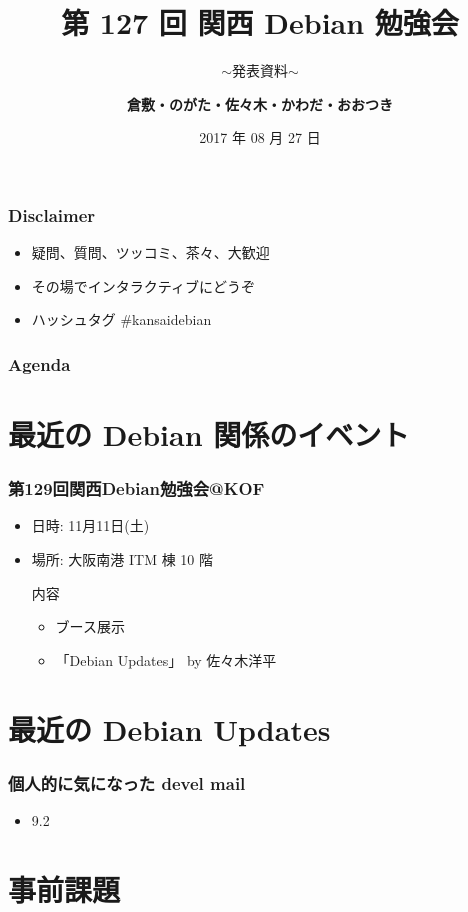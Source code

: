 \documentclass[cjk,dvipdfmx,12pt,compress,%
hyperref={bookmarks=true,bookmarksnumbered=true,bookmarksopen=false,%
colorlinks=false,%
pdftitle={第 120 回 関西 Debian 勉強会},%
pdfauthor={倉敷・のがた・佐々木・かわだ・おおつき},%
pdfsubject={資料},%
}]{beamer}
\title{第 127 回 関西 Debian 勉強会}
\subtitle{$\sim$発表資料$\sim$}
\author[おおつき]{{\large\bf 倉敷・のがた・佐々木・かわだ・おおつき}}
\institute[Debian JP]{{\normalsize\tt 関西 Debian 勉強会}}
\date{{\small 2017 年 08 月 27 日}}
\begin{document}
\begin{frame}
\titlepage
\end{frame}

\begin{frame}[fragile]
  \frametitle{Disclaimer}
  \begin{itemize}
  \item 疑問、質問、ツッコミ、茶々、\alert{大歓迎}
  \item その場でインタラクティブにどうぞ
  \item ハッシュタグ \#kansaidebian
  \end{itemize}
\end{frame}

\frametitle{Agenda}

\tableofcontents

\section{最近の Debian 関係のイベント}
\begin{frame}[fragile]
  \frametitle{第129回関西Debian勉強会@KOF}
  \begin{itemize}
  \item 日時: 11月11日(土)
  \item 場所: 大阪南港 ITM 棟 10 階
  \begin{block}{内容}
    \begin{itemize}
     \item ブース展示
     \item「Debian Updates」 by 佐々木洋平
    \end{itemize}
  \end{block}
\end{itemize}
\end{frame}

\section{最近の Debian Updates}

\begin{frame}[fragile]
  \frametitle{個人的に気になった devel mail}
  \begin{itemize}
    \item 9.2
  \end{itemize}
\end{frame}


\section{事前課題}
\end{document}
